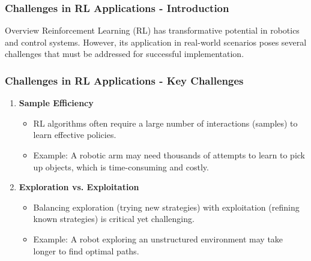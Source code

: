 \documentclass[aspectratio=169]{beamer}
\begin{document}
\begin{frame}[fragile]
    \frametitle{Challenges in RL Applications - Introduction}
    \begin{block}{Overview}
        Reinforcement Learning (RL) has transformative potential in robotics and control systems. 
        However, its application in real-world scenarios poses several challenges that must be addressed for successful implementation.
    \end{block}
\end{frame}

\begin{frame}[fragile]
    \frametitle{Challenges in RL Applications - Key Challenges}
    \begin{enumerate}
        \item \textbf{Sample Efficiency}
            \begin{itemize}
                \item RL algorithms often require a large number of interactions (samples) to learn effective policies.
                \item Example: A robotic arm may need thousands of attempts to learn to pick up objects, which is time-consuming and costly.
            \end{itemize}
        
        \item \textbf{Exploration vs. Exploitation}
            \begin{itemize}
                \item Balancing exploration (trying new strategies) with exploitation (refining known strategies) is critical yet challenging.
                \item Example: A robot exploring an unstructured environment may take longer to find optimal paths.
            \end{itemize}
    \end{enumerate}
\end{frame}
\end{document}
